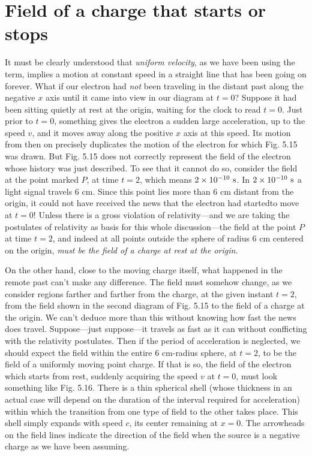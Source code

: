 \section{Field of a charge that starts or stops}

It must be clearly understood that \emph{uniform velocity}, as we have
been using the term, implies a motion at constant speed in a straight
line that has been going on forever. What if our electron had \emph{not}
been traveling in the distant past along the negative $x$ axis until it
came into view in our diagram at $t = 0$? Suppose it had been sitting
quietly at rest at the origin, waiting for the clock to read $t = 0$. Just
prior to $t = 0$, something gives the electron a sudden large acceleration,
up to the speed $v$, and it moves away along the positive $x$ axis
at this speed. Its motion from then on precisely duplicates the motion
of the electron for which Fig. 5.15 was drawn. But Fig. 5.15
does not correctly represent the field of the electron whose history
was just described. To see that it cannot do so, consider the field at
the point marked $P$, at time $t = 2$, which means $2 \times 10^{-10}\ \sunit$. In
$2 \times 10^{-10}\ \sunit$ a light signal travels 6 cm. Since this point lies more
than 6 cm distant from the origin, it could not have received the news
that the electron had startedto move at $t = 0$! Unless there is a
gross violation of relativity---and we are taking the postulates of
relativity as basis for this whole discussion---the field at the point $P$
at time $t = 2$, and indeed at all points outside the sphere of radius
6 cm centered on the origin, \emph{must be the field of a charge at rest at the
origin.}


On the other hand, close to the moving charge itself, what happened
in the remote past can't make any difference. The field must
somehow change, as we consider regions farther and farther from
the charge, at the given instant $t = 2$, from the field shown in the
second diagram of Fig. 5.15 to the field of a charge at the origin. We
can't deduce more than this without knowing how fast the news does
travel. Suppose---just suppose---it travels as fast as it can without
confficting with the relativity postulates. Then if the period of acceleration
is neglected, we should expect the field within the entire
6 cm-radius sphere, at $t = 2$, to be the field of a uniformly moving
point charge. If that is so, the field of the electron which starts from
rest, suddenly acquiring the speed $v$ at $t = 0$, must look something
like Fig. 5.16. There is a thin spherical shell (whose thickness in an
actual case will depend on the duration of the interval required for
acceleration) within which the transition from one type of field to
the other takes place. This shell simply expands with speed $c$, its
center remaining at $x = 0$. The arrowheads on the field lines indicate
the direction of the field when the source is a negative charge
as we have been assuming.

